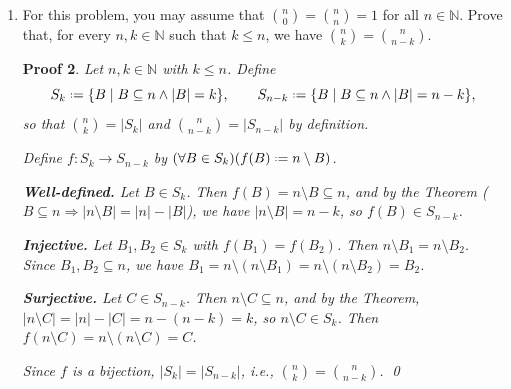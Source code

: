 \documentclass[12pt]{article}
\newcommand{\defeq}{\mathrel{\vcenter{\baselineskip0.5ex \lineskiplimit0pt
                     \hbox{\scriptsize.}\hbox{\scriptsize.}}}=}
\theoremstyle{proofstyle}
\newtheorem*{proof*}{Proof}
\begin{document}
\begin{enumerate}[left=0pt, itemsep=2em, parsep=1em]
\begin{proof*}
Since $\{G_1, G_2, G_3, G_4\}$ partitions $\mathcal{S}$ and $\mathcal{X} \subseteq \mathcal{S}$,
the sets $\mathcal{X} \cap G_1, \ldots, \mathcal{X} \cap G_4$ are pairwise disjoint with union
$\mathcal{X}$. Observe,
\[
  |\mathcal{X}| = \sum_{i=1}^{4} |\mathcal{X} \cap G_i| \leq 4 \times 2 = 8,
\]
contradicting $|\mathcal{X} \geq 9|$.

Therefore our claim that $|\mathcal{X} \cap G_i| \leq 2$ for all $i$ is false, so there
exists some $i$ with $|\mathcal{X} \cap G_i| = 3$, i.e., $G_i \subseteq \mathcal{X}$. The
three distinct elements of $G_i$ are then in $\mathcal{X}$ and sum to 40, giving
$x_1, x_2, x_3 \in \mathcal{X}$ with $x_1 + x_2 + x_3 = 40$. \qed
\end{proof*}
\newpage

\item For this problem, you may assume that $\binom{n}{0} = \binom{n}{n} = 1$ for all $n \in \mathbb{N}$.
Prove that, for every $n, k \in \mathbb{N}$ such that $k \leq n$, we have
$\binom{n}{k} = \binom{n}{n-k}$.

\begin{proof*}
Let $n, k \in \mathbb{N}$ with $k \leq n$. Define
\[
  S_k \defeq \{B \mid B \subseteq n \land |B| = k\}, \qquad
  S_{n-k} \defeq \{B \mid B \subseteq n \land |B| = n-k\},
\]
so that $\binom{n}{k} = |S_k|$ and $\binom{n}{n-k} = |S_{n-k}|$ by definition.

Define $f : S_k \to S_{n-k}$ by $(\forall B \in S_k)(f(B) \defeq n \setminus B)$.

\textbf{Well-defined.} Let $B \in S_k$. Then $f(B) = n \setminus B \subseteq n$, and by the
Theorem ($B \subseteq n \Rightarrow |n \setminus B| = |n| - |B|$), we have
$|n \setminus B| = n - k$, so $f(B) \in S_{n-k}$.

\textbf{Injective.} Let $B_1, B_2 \in S_k$ with $f(B_1) = f(B_2)$. Then
$n \setminus B_1 = n \setminus B_2$. Since $B_1, B_2 \subseteq n$, we have
$B_1 = n \setminus (n \setminus B_1) = n \setminus (n \setminus B_2) = B_2$.

\textbf{Surjective.} Let $C \in S_{n-k}$. Then $n \setminus C \subseteq n$, and by the
Theorem, $|n \setminus C| = |n| - |C| = n - (n-k) = k$, so $n \setminus C \in S_k$.
Then $f(n \setminus C) = n \setminus (n \setminus C) = C$.

Since $f$ is a bijection, $|S_k| = |S_{n-k}|$, i.e., $\binom{n}{k} = \binom{n}{n-k}$. \qed
\end{proof*}
\newpage


\end{enumerate}
\end{document}
